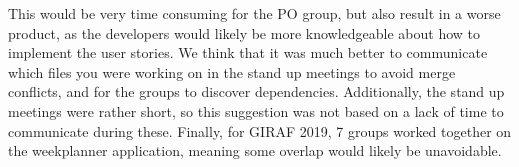 This would be very time consuming for the PO group, but also result in a worse product, as the developers would likely be more knowledgeable about how to implement the user stories.
We think that it was much better to communicate which files you were working on in the stand up meetings to avoid merge conflicts, and for the groups to discover dependencies.
Additionally, the stand up meetings were rather short, so this suggestion was not based on a lack of time to communicate during these.
Finally, for GIRAF 2019, 7 groups worked together on the weekplanner application, meaning some overlap would likely be unavoidable.

